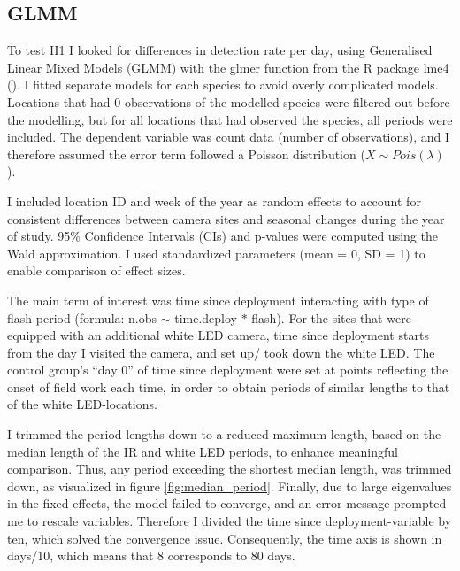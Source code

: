 	\subsection*{GLMM}
To test H1 I looked for differences in detection rate per day, using Generalised Linear Mixed Models (GLMM) with the glmer function from the R package lme4 (\cite{lme4}).
I fitted separate models for each species to avoid overly complicated models. 
Locations that had 0 observations of the modelled species were filtered out before the modelling, but for all locations that had observed the species, all periods were included.
The dependent variable was count data (number of observations), and I therefore assumed the error term followed a Poisson distribution ($ X \sim Pois(\lambda) $).

I included location ID and week of the year as random effects to account for consistent differences between camera sites and seasonal changes during the year of study.
95\% Confidence Intervals (CIs) and p-values were computed using the Wald approximation.
I used standardized parameters (mean = 0, SD = 1) to enable comparison of effect sizes.

The main term of interest was time since deployment interacting with type of flash period (formula: n.obs $\sim$ time.deploy $\ast$ flash).
For the sites that were equipped with an additional white LED camera, time since deployment starts from the day I visited the camera, and set up/ took down the white LED.
The control group’s “day 0” of time since deployment were set at points reflecting the onset of field work each time, in order to obtain periods of similar lengths to that of the white LED-locations.

I trimmed the period lengths down to a reduced maximum length, based on the median length of the IR and white LED periods, to enhance meaningful comparison.
Thus, any period exceeding the shortest median length, was trimmed down, as visualized in figure \ref{fig:median_period}.
Finally, due to large eigenvalues in the fixed effects, the model failed to converge, and an error message prompted me to rescale variables.
Therefore I divided the time since deployment-variable by ten, which solved the convergence issue.
Consequently, the time axis is shown in days/10, which means that 8 corresponds to 80 days.


